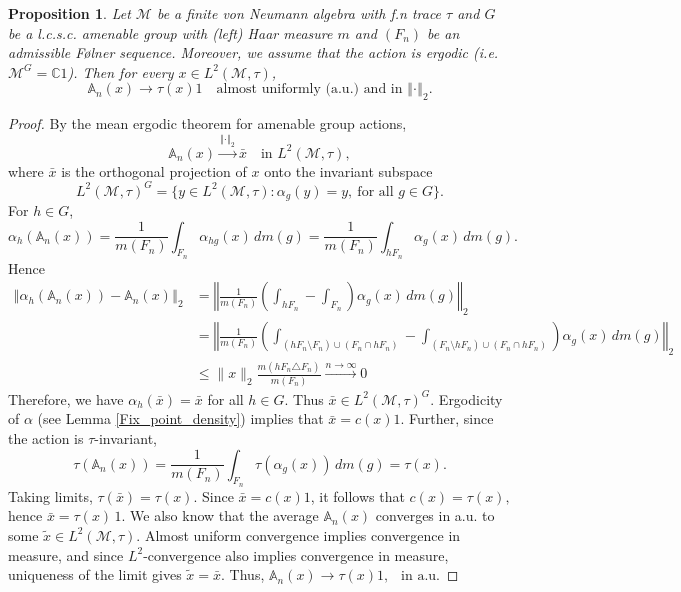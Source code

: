 \documentclass[11pt]{amsart}
\newtheorem{prop}[thm]{Proposition}
\theoremstyle{definition}
\theoremstyle{myremark}
\numberwithin{equation}{section}
\def\A{\mathbb A}
\newcommand{\CM}{\mathcal{M}}
\newcommand{\norm}[1]{\left\Vert#1\right\Vert}
\begin{document}
\begin{prop}\label{Mean_ergodic_thm} Let  $\CM$ be a finite von Neumann algebra with f.n trace $\tau$ and 
 $G$ be a l.c.s.c. amenable  group with (left) Haar measure $m$ and  $(F_n)$ be an admissible F\o lner sequence. Moreover, we assume that the action is ergodic (i.e. $\CM^G = \mathbb{C}1$).
 Then for every $x \in L^2(\CM,\tau)$,
\[
\A_n(x) \longrightarrow \tau(x)1 \quad \text{almost uniformly (a.u.)} \text{ and in } \norm{ \cdot }_2.
\]
\end{prop}


\begin{proof} 
By the mean ergodic theorem for amenable group actions,
\[
\A_n(x) \xrightarrow{ \norm{\cdot}_2} \bar{x} \quad \text{in } L^2(\CM, \tau),
\]
where $\bar{x}$ is the orthogonal projection of $x$ onto the invariant subspace
\[
L^2(\CM,\tau)^G = \{ y \in L^2(\CM, \tau): \alpha_g(y)=y ,~\text{for all } g \in G \}.
\]
For $h \in G$,
\[
\alpha_h(\A_n(x)) 
= \frac{1}{m(F_n)} \int_{F_n} \alpha_{hg}(x)\, dm(g)
= \frac{1}{m(F_n)} \int_{hF_n} \alpha_{g}(x)\, dm(g).
\]
Hence
\begin{align*}
 \norm{ \alpha_h(\A_n(x)) - \A_n(x)}_2
&= \norm{\frac{1}{m(F_n)} \left( \int_{hF_n} - \int_{F_n} \right)\alpha_g(x)\, dm(g)}_2\\
&= \norm{  \frac{1}{m(F_n)} \left( \int_{(hF_n\setminus F_n)\cup (F_n\cap hF_n)} - \int_{(F_n\setminus hF_n) \cup ( F_n \cap hF_n)} \right)\alpha_g(x)\, dm(g)}_2\\
&\leq \|x\|_2\frac{m(hF_n \triangle F_n)}{m(F_n)} \xrightarrow{ n \to \infty } 0
\end{align*}
Therefore, we have $ \alpha_h(\bar x) =\bar x $ for all $ h \in G$.
Thus $\bar{x} \in L^2(\CM,\tau)^G$. Ergodicity of $\alpha$ (see Lemma \ref{Fix_point_density})  implies that $\bar{x}=c(x)1$. Further, since the action is  $\tau$-invariant,
\[
\tau(\A_n(x)) 
= \frac{1}{m(F_n)} \int_{F_n} \tau(\alpha_g(x))\, dm(g)
= \tau(x).
\]
Taking limits, $ \tau(\bar{x}) = \tau(x).$
Since $\bar{x} = c(x) 1$, it follows that $ c(x) = \tau(x),$ 
hence $ \bar{x} = \tau(x)\, 1.$
 We also know that the average $\A_n(x)$ converges in a.u. to some $\tilde{x} \in L^2(\CM,\tau)$. Almost uniform convergence implies convergence in measure, and since $L^2$-convergence also implies convergence in measure, uniqueness of the limit gives $ \tilde{x} = \bar{x}.$ Thus, $ \A_n(x) \longrightarrow \tau(x)1, ~~\text{ in a.u}.$
\end{proof}
\end{document}
